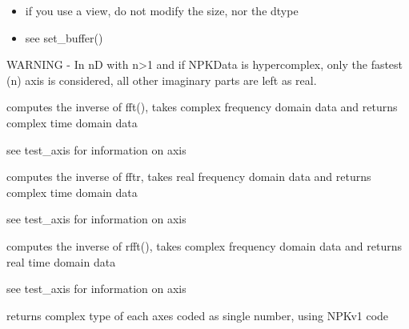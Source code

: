\documentclass[letterpaper,10pt,openany,oneside]{sphinxmanual}
\begin{document}
\begin{fulllineitems}
\begin{fulllineitems}
\begin{itemize}
\item {} 
if you use a view, do not modify the size, nor the dtype

\item {} 
see set\_buffer()

\end{itemize}

WARNING
- In nD with n\textgreater{}1 and if NPKData is hypercomplex, only the fastest (n) axis is considered, all other imaginary parts are left as real.

\end{fulllineitems}


\begin{fulllineitems}
\label{rst/code:NPKData.NPKData.ifft}
computes the inverse of fft(),
takes complex frequency domain data and returns complex time domain data

see test\_axis for information on axis

\end{fulllineitems}


\begin{fulllineitems}
\label{rst/code:NPKData.NPKData.ifftr}
computes the inverse of fftr,
takes real frequency domain data and returns complex time domain data

see test\_axis for information on axis

\end{fulllineitems}


\begin{fulllineitems}
\label{rst/code:NPKData.NPKData.irfft}
computes the inverse of rfft(),
takes complex frequency domain data and returns real time domain data

see test\_axis for information on axis

\end{fulllineitems}


\begin{fulllineitems}
\label{rst/code:NPKData.NPKData.itype}
returns complex type of each axes coded as single number, using NPKv1 code


\end{fulllineitems}
\end{fulllineitems}
\end{document}
